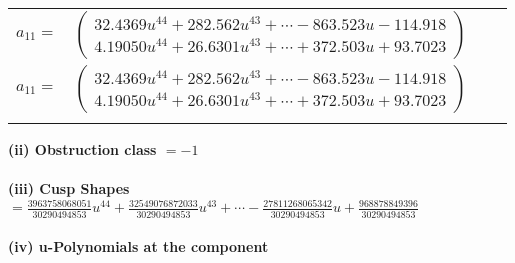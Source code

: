 \documentclass[1p]{elsarticle_modified}
\theoremstyle{definition}
\begin{document}
\begin{tabular}{m{7pt} m{180pt} m{7pt} m{180pt} }
\flushright $a_{11}=$&$\begin{pmatrix}32.4369 u^{44}+282.562 u^{43}+\cdots-863.523 u-114.918\\4.19050 u^{44}+26.6301 u^{43}+\cdots+372.503 u+93.7023\end{pmatrix}$\\ \flushright $a_{11}=$&$\begin{pmatrix}32.4369 u^{44}+282.562 u^{43}+\cdots-863.523 u-114.918\\4.19050 u^{44}+26.6301 u^{43}+\cdots+372.503 u+93.7023\end{pmatrix}$\\&\end{tabular}
\flushleft \textbf{(ii) Obstruction class $= -1$}\\~\\
\flushleft \textbf{(iii) Cusp Shapes $= \frac{3963758068051}{30290494853} u^{44}+\frac{32549076872033}{30290494853} u^{43}+\cdots-\frac{27811268065342}{30290494853} u+\frac{968878849396}{30290494853}$}\\~\\
\newpage\renewcommand{\arraystretch}{1}
\flushleft \textbf{(iv) u-Polynomials at the component}\newline \\
\end{document}
